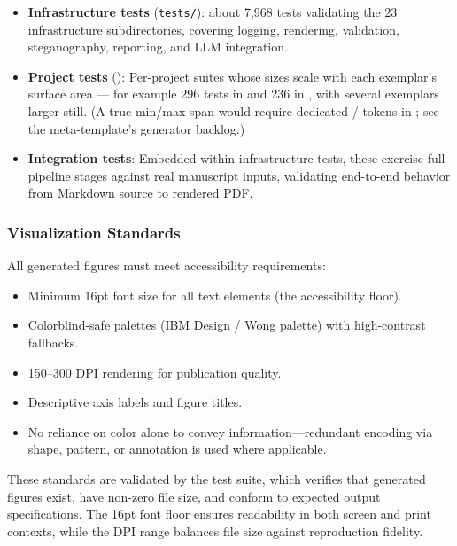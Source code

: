 \documentclass[
]{article}
\providecommand{\tightlist}{%
  \setlength{\itemsep}{0pt}\setlength{\parskip}{0pt}}
\begin{document}
\begin{itemize}
\tightlist
\item
  \textbf{Infrastructure tests} (\texttt{tests/}): about 7,968
  tests validating the 23 infrastructure subdirectories, covering
  logging, rendering, validation, steganography, reporting, and LLM
  integration.
\item
  \textbf{Project tests} (): Per-project
  suites whose sizes scale with each exemplar's surface area --- for
  example 296 tests in  and 236
  in , with several exemplars larger
  still. (A true min/max span would require dedicated
  /
  tokens in ; see the
  meta-template's generator backlog.)
\item
  \textbf{Integration tests}: Embedded within infrastructure tests,
  these exercise full pipeline stages against real manuscript inputs,
  validating end-to-end behavior from Markdown source to rendered PDF.
\end{itemize}

\subsubsection{Visualization Standards}\label{visualization-standards}

All generated figures must meet accessibility requirements:

\begin{itemize}
\tightlist
\item
  Minimum 16pt font size for all text elements (the accessibility
  floor).
\item
  Colorblind-safe palettes (IBM Design / Wong palette) with
  high-contrast fallbacks.
\item
  150--300 DPI rendering for publication quality.
\item
  Descriptive axis labels and figure titles.
\item
  No reliance on color alone to convey information---redundant encoding
  via shape, pattern, or annotation is used where applicable.
\end{itemize}

These standards are validated by the 
test suite, which verifies that generated figures exist, have non-zero
file size, and conform to expected output specifications. The 16pt font
floor ensures readability in both screen and print contexts, while the
DPI range balances file size against reproduction fidelity.
\end{document}
